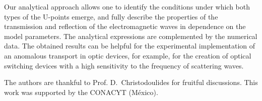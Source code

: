 \documentclass[aps,pra,reprint,showpacs,bibnotes,preprintnumbers,twoside,eqsecnum]{revtex4-1}
\begin{document}
Our analytical approach allows one to identify the conditions under which both types of the U-points emerge, and fully describe the properties of the transmission and reflection of the electromagnetic waves in dependence on the model parameters. The analytical expressions are complemented by the numerical data. The obtained results can be helpful for the experimental implementation of an anomalous transport in optic devices, for example, for the creation of optical switching devices with a high sensitivity to the frequency of scattering waves.

\begin{acknowledgments}
The authors are thankful to Prof. D.~Christodoulides for fruitful discussions. This work was supported by the CONACYT (M\'exico).
\end{acknowledgments}
\end{document}

